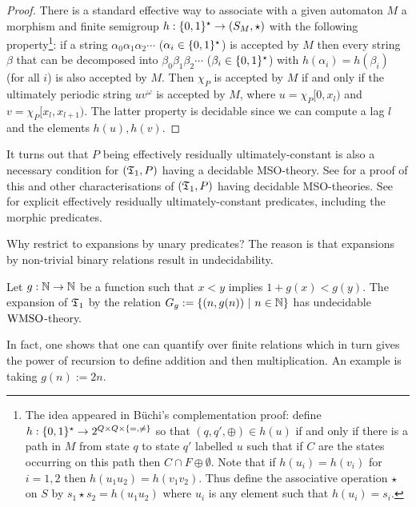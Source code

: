 \begin{proof}
There is a standard effective way to associate with a given automaton $M$ a morphism and finite semigroup $h:\{0,1\}^\star \to (S_M,\star)$ with the following property\footnote{The idea appeared in B\"uchi's complementation proof: define $h:\{0,1\}^\star \to 2^{Q \times Q \times \{=,\neq\}}$ so that $(q,q',\oplus) \in h(u)$ if
and only if there is a path in $M$ from state $q$ to state $q'$ labelled $u$ such that if $C$ are the states occurring on this path then $C \cap F \oplus \emptyset $. Note that if $h(u_i) = h(v_i)$ for $i = 1,2$ then $h(u_1u_2) = h(v_1v_2)$. Thus define the associative operation $\star$ on $S$ by
$s_1 \star  s_2 = h(u_1u_2)$ where $u_i$ is any element such that $h(u_i) = s_i$.
}: if a string $\alpha_0\alpha_1\alpha_2\cdots$ ($\alpha_i \in \{0,1\}^\star$) is accepted by $M$
then every string $\beta$ that can be decomposed into $\beta_0\beta_1\beta_2\cdots$ ($\beta_i \in \{0,1\}^\star$) with $h(\alpha_i)=h(\beta_i)$ (for all $i$) is also accepted by $M$.
Then $\chi_P$ is accepted by $M$ if and only if
the ultimately periodic string $uv^\omega$ is accepted by $M$, where $u = \chi_P[0,x_l)$ and $v = \chi_P[x_l,x_{l+1})$. The latter property is decidable since we can compute a lag $l$ and the elements $h(u),h(v)$.
\end{proof}

It turns out that $P$ being effectively residually ultimately-constant is also a necessary condition for $(\mathfrak{T}_1,P)$ having a decidable MSO-theory. See \cite{RaTh06, rabinovich07} for a proof of this and other characterisations of $(\mathfrak{T}_1,P)$ having decidable MSO-theories. See \cite{CaTh02,Bara07} for explicit effectively residually ultimately-constant predicates, including the morphic predicates.
  
Why restrict to expansions by unary predicates? The reason is that expansions by non-trivial binary relations result in undecidability. 

\begin{theorem} \cite{ElRa66}
Let $g:\mathbb{N} \to \mathbb{N}$ be a function such that $x < y$ implies $1 + g(x) < g(y)$.
The expansion of $\mathfrak{T}_1$ by the relation $G_g:= \{(n,g(n)) \ \vert \  n \in \mathbb{N}\}$ has undecidable $\mbox{\rm WMSO}$-theory.
\end{theorem}

In fact, one shows that one can quantify over finite relations which in turn gives the power of recursion to define addition and then multiplication.
An example is taking $g(n) := 2n$.

